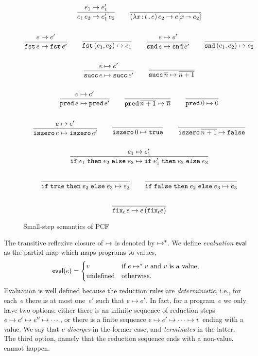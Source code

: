 \begin{figure}[htpb]
  \centering
\begin{gather*}
  \begin{gathered}\dfrac{e_1 \mapsto e_1'}{e_1 \, e_2 \mapsto e_1'\, e_2}\end{gathered}
  \qquad
  \dfrac{}{(\lambda x \,{:}\, t\,.\,e)\,e_2 \mapsto e[x \shortrightarrow e_2]}
  \\ \\
  \begin{gathered}\dfrac{e \mapsto e'}{\mathtt{fst}\,e \mapsto \mathtt{fst}\,e'}\end{gathered}
  \qquad
  \dfrac{}{\mathtt{fst}\,(e_1, e_2) \mapsto e_1}
  \qquad
  \begin{gathered}\dfrac{e \mapsto e'}{\mathtt{snd}\,e \mapsto \mathtt{snd}\,e'}\end{gathered}
  \qquad
  \dfrac{}{\mathtt{snd}\,(e_1, e_2) \mapsto e_2}
  \\ \\
  \begin{gathered}\dfrac{e \mapsto e'}{\mathtt{succ}\,e \mapsto \mathtt{succ}\,e'}\end{gathered}
  \qquad
  \dfrac{}{\mathtt{succ}\,\overline{n} \mapsto \overline{n+1}}
  \\ \\
  \begin{gathered}\dfrac{e \mapsto e'}{\mathtt{pred}\,e \mapsto \mathtt{pred}\,e'}\end{gathered}
  \qquad
  \dfrac{}{\mathtt{pred}\,\overline{n+1} \mapsto \overline{n}}
  \qquad
  \dfrac{}{\mathtt{pred}\,0 \mapsto 0}
  \\ \\
  \begin{gathered}\dfrac{e \mapsto e'}{\mathtt{iszero}\,e \mapsto \mathtt{iszero}\,e'}\end{gathered}
  \qquad
  \dfrac{}{\mathtt{iszero}\,0 \mapsto \mathtt{true}}
  \qquad
  \dfrac{}{\mathtt{iszero}\,\overline{n+1} \mapsto \mathtt{false}}
  \\ \\
  \begin{gathered}\dfrac{e_1 \mapsto e_1'}{\mathtt{if}\;e_1\;\mathtt{then}\;e_2\;\mathtt{else}\;e_3 \mapsto \mathtt{if}\;e_1'\;\mathtt{then}\;e_2\;\mathtt{else}\;e_3}\end{gathered}
  \\ \\
  \dfrac{}{\mathtt{if}\;\mathtt{true}\;\mathtt{then}\;e_2\;\mathtt{else}\;e_3 \mapsto e_2}
  \qquad
  \dfrac{}{\mathtt{if}\;\mathtt{false}\;\mathtt{then}\;e_2\;\mathtt{else}\;e_3 \mapsto e_3}
  \\ \\
  \dfrac{}{\mathtt{fix}_t\,e \mapsto e\,(\mathtt{fix}_t e)}
\end{gather*}
  \caption{Small-step semantics of PCF}
  \label{fig:pcf}
\end{figure}

The transitive reflexive closure of $\mapsto$ is denoted by $\mapsto^{*}$.
We define \emph{evaluation} $\mathsf{eval}$ as the partial map which
maps programs to values,
%
\begin{equation*}
  \mathsf{eval}(e) =
  \begin{cases}
    v & \text{if $e \mapsto^{*} v$ and $v$ is a value,}\\
    \text{undefined} & \text{otherwise.}
  \end{cases}
\end{equation*}
%
Evaluation is well defined because the reduction rules are
\emph{deterministic}, i.e., for each~$e$ there is at most one~$e'$
such that $e \mapsto e'$. In fact, for a program~$e$ we only have two
options: either there is an infinite sequence of reduction steps $e
\mapsto e' \mapsto e'' \mapsto \cdots$, or there is a finite sequence $e
\mapsto e' \mapsto \cdots \mapsto v$ ending with a value. We say that $e$
\emph{diverges} in the former case, and \emph{terminates} in the
latter. The third option, namely that the reduction sequence ends with
a non-value, cannot happen.

